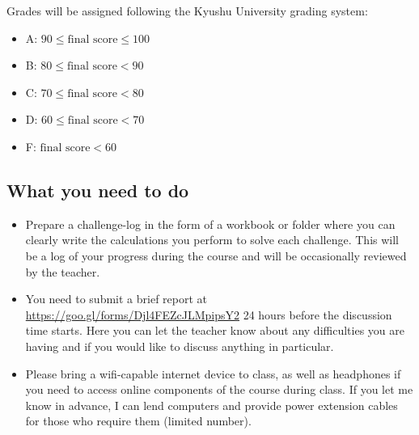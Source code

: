 Grades will be assigned following the Kyushu University grading system:
\begin{itemize}
    \item A: $90 \le \text{final score} \le 100$
    \item B: $80 \le \text{final score} < 90$
    \item C: $70 \le \text{final score} < 80$
    \item D: $60 \le \text{final score} < 70$
    \item F: $\text{final score} < 60$
\end{itemize}



\subsection{What you need to do}
\begin{itemize}
    \item Prepare a challenge-log in the form of a workbook or folder where you can clearly write the calculations you perform to solve each challenge. This will be a log of your progress during the course and will be occasionally reviewed by the teacher.
    \item You need to submit a brief report at \url{https://goo.gl/forms/Djl4FEZcJLMpipsY2} 24 hours before the discussion time starts. Here you can let the teacher know about any difficulties you are having and if you would like to discuss anything in particular.
    \item Please bring a wifi-capable internet device to class, as well as headphones if you need to access online components of the course during class. If you let me know in advance, I can lend computers and provide power extension cables for those who require them (limited number).
\end{itemize}
